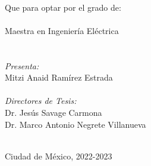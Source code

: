 \begin{center}
\HRule \\
\begin{center}
    {\Large Que para optar por el grado de: \\ \phantom{holi}\\ 
    \LARGE{Maestra en Ingeniería Eléctrica}}\\
    \phantom{holi}\\
    \bigskip
\phantom{holi}\\
    {\Large\emph{Presenta:}}\\	
{\LARGE Mitzi Anaid Ramírez Estrada\\}
\bigskip
\phantom{holi}\\
\bigskip
{\Large \emph{Directores de Tesis:} \\
Dr. Jesús Savage Carmona\\
Dr. Marco Antonio Negrete Villanueva}\\
\phantom{holi}\\
\bigskip

{\large Ciudad de México, 2022-2023}
\end{center}
\end{center}	
